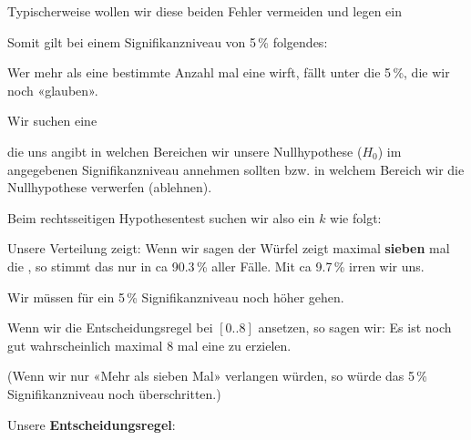 Typischerweise wollen wir diese beiden Fehler vermeiden und legen ein


Somit gilt bei einem Signifikanzniveau von 5\,\%
folgendes:

Wer mehr als eine bestimmte Anzahl mal eine  wirft, fällt unter die 5\,\%, die wir noch «glauben».

Wir suchen eine


die uns angibt in welchen Bereichen wir unsere Nullhypothese ($H_0$)
im angegebenen Signifikanzniveau annehmen sollten bzw. in welchem
Bereich wir die Nullhypothese verwerfen (ablehnen).
\newpage


Beim
rechtsseitigen Hypothesentest suchen wir also ein $k$ wie folgt:


Unsere Verteilung zeigt: Wenn wir sagen der Würfel zeigt maximal
\textbf{sieben} mal die , so stimmt das nur in ca 90.3\,\%
aller Fälle. Mit ca 9.7\,\% irren wir uns.

Wir müssen für ein 5\,\% Signifikanzniveau noch höher gehen.

Wenn wir die Entscheidungsregel bei $[0..8]$ ansetzen, so sagen wir: Es
ist noch gut wahrscheinlich maximal $8$ mal eine  zu
erzielen.

(Wenn wir nur «Mehr als sieben Mal» verlangen würden, so würde das
5\,\% Signifikanzniveau noch überschritten.)


Unsere \textbf{Entscheidungsregel}:


